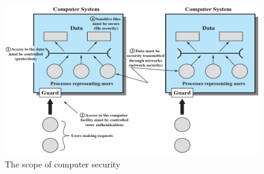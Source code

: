 \documentclass[12pt]{article}
\begin{document}
				\begin{figure}[h!]
					\centering
					\includegraphics[scale=0.60]{img/scope.PNG}
					\caption{The	scope	of	computer	security\label{fig:4}}
				\end{figure}
\end{document}
